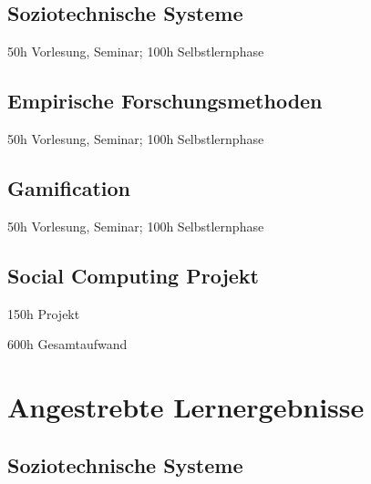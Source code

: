 \subsection*{Soziotechnische
Systeme\label{/mi-2017/modulbeschreibungen-bachelor/BA_Vertiefung_SocialComputing}}\label{soziotechnische-systemepathlabelmi-2017modulbeschreibungen-bachelorbaux5fvertiefungux5fsocialcomputing}

50h Vorlesung, Seminar; 100h Selbstlernphase

\subsection*{Empirische
Forschungsmethoden\label{/mi-2017/modulbeschreibungen-bachelor/BA_Vertiefung_SocialComputing}}\label{empirische-forschungsmethodenpathlabelmi-2017modulbeschreibungen-bachelorbaux5fvertiefungux5fsocialcomputing}

50h Vorlesung, Seminar; 100h Selbstlernphase

\subsection*{Gamification\label{/mi-2017/modulbeschreibungen-bachelor/BA_Vertiefung_SocialComputing}}\label{gamificationpathlabelmi-2017modulbeschreibungen-bachelorbaux5fvertiefungux5fsocialcomputing}

50h Vorlesung, Seminar; 100h Selbstlernphase

\subsection*{Social Computing
Projekt\label{/mi-2017/modulbeschreibungen-bachelor/BA_Vertiefung_SocialComputing}}\label{social-computing-projektpathlabelmi-2017modulbeschreibungen-bachelorbaux5fvertiefungux5fsocialcomputing}

150h Projekt

600h Gesamtaufwand

\section*{Angestrebte
Lernergebnisse\label{/mi-2017/modulbeschreibungen-bachelor/BA_Vertiefung_SocialComputing}}\label{angestrebte-lernergebnissepathlabelmi-2017modulbeschreibungen-bachelorbaux5fvertiefungux5fsocialcomputing}

\subsection*{Soziotechnische
Systeme\label{/mi-2017/modulbeschreibungen-bachelor/BA_Vertiefung_SocialComputing}}\label{soziotechnische-systemepathlabelmi-2017modulbeschreibungen-bachelorbaux5fvertiefungux5fsocialcomputing-1}

